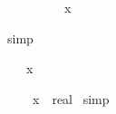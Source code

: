 \begin{isabellebody}
\begin{isamarkuptxt}
\begin{isabelle}
\ {}{\isachardot}\ {\isacharhash}{}\ {\isacharslash}\ {\isacharhash}{}\ {\isacharasterisk}\ {\isacharparenleft}{\isacharhash}{}\ {\isacharslash}\ {\isacharhash}{}{}{\isacharparenright}\ {\isacharless}\ x%
\end{isabelle}%
\end{isamarkuptxt}%
\ simp%
\begin{isamarkuptxt}%
\begin{isabelle}%
\ {}{\isachardot}\ {\isacharhash}{}\ {\isacharless}\ x\ {\isacharasterisk}\ {\isacharhash}{}%
\end{isabelle}%
\end{isamarkuptxt}%
\isanewline
\isanewline
{}\ {\isachardoublequote}{\isacharparenleft}{\isacharhash}{}{\isacharslash}{\isacharhash}{}{\isacharparenright}\ {\isacharasterisk}\ {\isacharparenleft}{\isacharhash}{}{}{\isacharcircum}{\isacharhash}{}{}{\isacharparenright}\ {\isacharless}\ {\isacharparenleft}x\ {\isacharcolon}{\isacharcolon}\ real{\isacharparenright}{\isachardoublequote}\isanewline
{}\ simp\ \isanewline
{}\isanewline
\isanewline
\isanewline
\isanewline
{}\isanewline
\end{isabellebody}%
